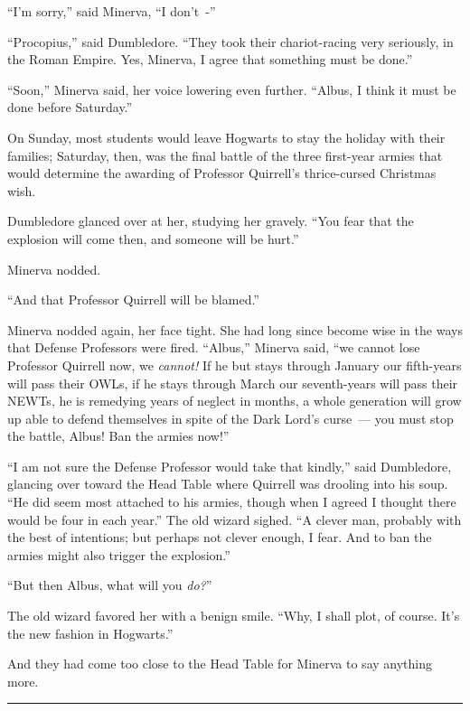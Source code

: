 ``I'm sorry,'' said Minerva, ``I don't~-''

``Procopius,'' said Dumbledore. ``They took their chariot-racing very seriously, in the Roman Empire. Yes, Minerva, I agree that something must be done.''

``Soon,'' Minerva said, her voice lowering even further. ``Albus, I think it must be done before Saturday.''

On Sunday, most students would leave Hogwarts to stay the holiday with their families; Saturday, then, was the final battle of the three first-year armies that would determine the awarding of Professor Quirrell's thrice-cursed Christmas wish.

Dumbledore glanced over at her, studying her gravely. ``You fear that the explosion will come then, and someone will be hurt.''

Minerva nodded.

``And that Professor Quirrell will be blamed.''

Minerva nodded again, her face tight. She had long since become wise in the ways that Defense Professors were fired. ``Albus,'' Minerva said, ``we cannot lose Professor Quirrell now, we \emph{cannot!} If he but stays through January our fifth-years will pass their OWLs, if he stays through March our seventh-years will pass their NEWTs, he is remedying years of neglect in months, a whole generation will grow up able to defend themselves in spite of the Dark Lord's curse~--- you must stop the battle, Albus! Ban the armies now!''

``I am not sure the Defense Professor would take that kindly,'' said Dumbledore, glancing over toward the Head Table where Quirrell was drooling into his soup. ``He did seem most attached to his armies, though when I agreed I thought there would be four in each year.'' The old wizard sighed. ``A clever man, probably with the best of intentions; but perhaps not clever enough, I fear. And to ban the armies might also trigger the explosion.''

``But then Albus, what will you \emph{do?}''

The old wizard favored her with a benign smile. ``Why, I shall plot, of course. It's the new fashion in Hogwarts.''

And they had come too close to the Head Table for Minerva to say anything more.

\begin{center}\rule{3in}{0.4pt}\end{center}

